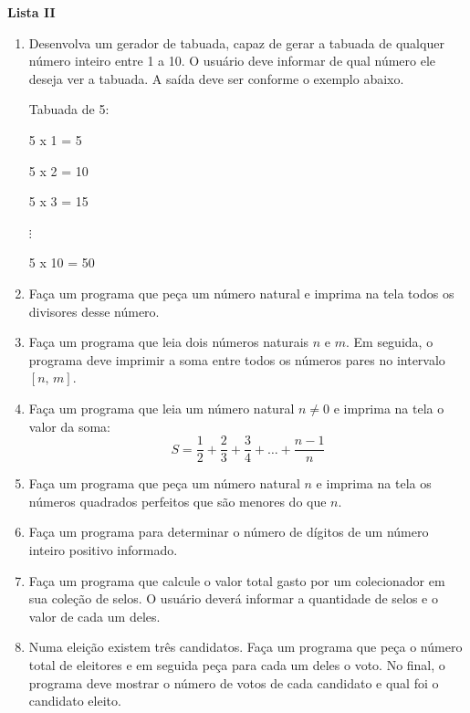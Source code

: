 \documentclass[12pt,a4paper]{article}
\begin{document}
\begin{center}
  \textbf{Lista II}
\end{center}

\begin{enumerate}
  \item Desenvolva um gerador de tabuada, capaz de gerar a tabuada de qualquer número inteiro
  entre 1 a 10. O usuário deve informar de qual número ele deseja ver a tabuada. A saída deve
  ser conforme o exemplo abaixo.

    \vspace{0.5cm}
    Tabuada de 5:
    
    5 x 1 = 5
    
    5 x 2 = 10
    
    5 x 3 = 15
    
    $\vdots$
    
    5 x 10 = 50
    
    \vspace{0.5cm}

  \item Faça um programa que peça um número natural e imprima na tela todos os 
  divisores desse número.

  \item Faça um programa que leia dois números naturais $n$ e $m$. Em seguida, o
  programa deve imprimir a soma entre todos os números pares no intervalo $[n,\, m]$.
  
  \item Faça um programa que leia um número natural $n \neq 0$ e imprima na tela o valor da soma:
  $$S = \frac{1}{2} + \frac{2}{3} + \frac{3}{4} + \ldots + \frac{n - 1}{n}$$
    
  \item Faça um programa que peça um número natural $n$ e imprima na tela os números 
  quadrados perfeitos que são menores do que $n$.
 
   \item Faça um programa para determinar o número de dígitos de um número
   inteiro positivo informado.
   
  \item Faça um programa que calcule o valor total gasto por um colecionador em sua coleção
  de selos. O usuário deverá informar a quantidade de selos e o valor de cada um deles.
  
  \item Numa eleição existem três candidatos. Faça um programa que peça o número total de eleitores
  e em seguida peça para cada um deles o voto. No final, o programa deve mostrar o número de votos
  de cada candidato e qual foi o candidato eleito.


\end{enumerate}
\end{document}
